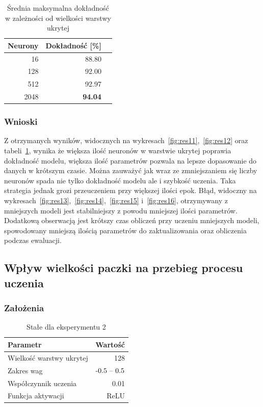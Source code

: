 \documentclass{article}
\begin{document}
\begin{table}[H]
	\caption{Średnia maksymalna dokładność w zależności od wielkości warstwy ukrytej}
	\label{tabela-res-11}
	\centering
	\begin{tabular}{rrr}
		\toprule
		Neurony & Dokładność [\%] \\
		\midrule
		16      & 88.80              \\
		128     & 92.00              \\
		512     & 92.97              \\
		2048    & \textbf{94.04}     \\
		\bottomrule
	\end{tabular}
\end{table}

\subsubsection*{Wnioski}

Z otrzymanych wyników, widocznych na wykresach~\ref{fig:res11},~\ref{fig:res12} oraz tabeli~\ref{tabela-res-11}, wynika że większa ilość neuronów w warstwie ukrytej poprawia dokładność modelu, większa ilość parametrów pozwala na lepsze dopasowanie do danych w krótszym czasie. Można zauważyć jak wraz ze zmniejszaniem się liczby neuronów spada nie tylko dokładność modelu ale i szybkość uczenia. Taka strategia jednak grozi przeuczeniem przy większej ilości epok. Błąd, widoczny na wykresach~\ref{fig:res13},~\ref{fig:res14},~\ref{fig:res15} i~\ref{fig:res16}, otrzymywany z mniejszych modeli jest stabilniejszy z powodu mniejszej ilości parametrów. Dodatkową obserwacją jest krótszy czas obliczeń przy uczeniu mniejszych modeli, spowodowany mniejszą ilością parametrów do zaktualizowania oraz obliczenia podczas ewaluacji.

\newpage
\subsection{Wpływ wielkości paczki na przebieg procesu uczenia}
\subsubsection*{Założenia}
\begin{table}[H]
	\caption{Stałe dla eksperymentu 2}
	\label{tabela-const-2}
	\centering
	\begin{tabular}{lr}
		\toprule
		Parametr                   & Wartość         \\
		\midrule
		Wielkość warstwy ukrytej & 128               \\
		Zakres wag                 & \($-0.5 -- 0.5$\) \\
		Współczynnik uczenia     & 0.01              \\
		Funkcja aktywacji          & ReLU              \\
		\bottomrule
	\end{tabular}
\end{table}
\end{document}
